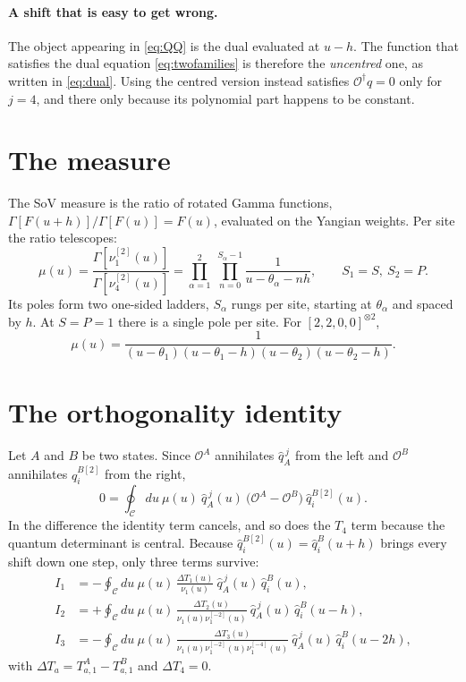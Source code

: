 \documentclass[11pt]{article}
\newcommand{\Op}{\mathcal{O}}
\newcommand{\Cc}{\mathcal{C}}
\newcommand{\qh}{\hat q}
\newcommand{\shift}[1]{^{[#1]}}
\begin{document}
\paragraph{A shift that is easy to get wrong.} The object appearing in \eqref{eq:QQ} is the dual
evaluated at $u-h$. The function that satisfies the dual equation \eqref{eq:twofamilies} is
therefore the \emph{uncentred} one, as written in \eqref{eq:dual}. Using the centred version
instead satisfies $\Op^\dagger q = 0$ only for $j=4$, and there only because its polynomial part
happens to be constant.

\section{The measure}

The SoV measure is the ratio of rotated Gamma functions, $\Gamma[F(u+h)]/\Gamma[F(u)] = F(u)$,
evaluated on the Yangian weights. Per site the ratio telescopes:
\begin{equation}
\mu(u) = \frac{\Gamma[\nu_1\shift{2}(u)]}{\Gamma[\nu_4\shift{2}(u)]}
= \prod_{\alpha=1}^{2}\ \prod_{n=0}^{S_\alpha-1}\frac{1}{u-\theta_\alpha-nh} ,
\qquad S_1 = S,\ S_2 = P .
\label{eq:measure}
\end{equation}
Its poles form two one-sided ladders, $S_\alpha$ rungs per site, starting at $\theta_\alpha$ and
spaced by $h$. At $S=P=1$ there is a single pole per site. For $[2,2,0,0]^{\otimes 2}$,
\begin{equation}
\mu(u) = \frac{1}{(u-\theta_1)(u-\theta_1-h)(u-\theta_2)(u-\theta_2-h)} .
\end{equation}

\section{The orthogonality identity}

Let $A$ and $B$ be two states. Since $\Op^A$ annihilates $\qh^{\,j}_A$ from the left and $\Op^B$
annihilates $\qh_i^{B[2]}$ from the right,
\begin{equation}
0 = \oint_{\Cc} du\ \mu(u)\ \qh^{\,j}_A(u)\ \big(\Op^A - \Op^B\big)\ \qh_i^{B[2]}(u) .
\label{eq:identity}
\end{equation}
In the difference the identity term cancels, and so does the $T_4$ term because the quantum
determinant is central. Because $\qh_i^{B[2]}(u) = \qh^B_i(u+h)$ brings every shift down one step,
only three terms survive:
\begin{align}
I_1 &= -\oint_{\Cc} du\ \mu(u)\,\frac{\Delta T_1(u)}{\nu_1(u)}\ \qh^{\,j}_A(u)\,\qh^B_i(u) ,
\label{eq:I1}\\
I_2 &= +\oint_{\Cc} du\ \mu(u)\,\frac{\Delta T_2(u)}{\nu_1(u)\nu_1\shift{-2}(u)}\ \qh^{\,j}_A(u)\,\qh^B_i(u-h) ,
\label{eq:I2}\\
I_3 &= -\oint_{\Cc} du\ \mu(u)\,\frac{\Delta T_3(u)}{\nu_1(u)\nu_1\shift{-2}(u)\nu_1\shift{-4}(u)}\ \qh^{\,j}_A(u)\,\qh^B_i(u-2h) ,
\label{eq:I3}
\end{align}
with $\Delta T_a = T^A_{a,1} - T^B_{a,1}$ and $\Delta T_4 = 0$.
\end{document}
